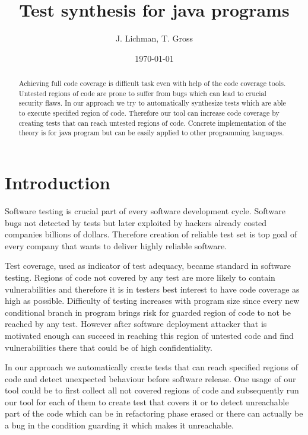 \documentclass[letterpaper,12pt]{article}
\begin{document}
\title{Test synthesis for java programs}
\author{J. Lichman, T. Gross}
\date{\today}
\maketitle

\begin{abstract}
\noindent Achieving full code coverage is difficult task even with help of the code coverage tools. Untested regions of code are prone to suffer from bugs which can lead to crucial security flaws. In our approach we try to automatically synthesize tests which are able to execute specified region of code. Therefore our tool can increase code coverage by creating tests that can reach untested regions of code. Concrete implementation of the theory is for java program but can be easily applied to other programming languages.
\end{abstract}


\section{Introduction}

Software testing is crucial part of every software development cycle. Software bugs not detected by tests but later exploited by hackers already costed companies billions of dollars. Therefore creation of reliable test set is top goal of every company that wants to deliver highly reliable software. 

Test coverage, used as indicator of test adequacy, became standard in software testing. Regions of code not covered by any test are more likely to contain vulnerabilities and therefore it is in testers best interest to have code coverage as high as possible. Difficulty of testing increases with program size since every new conditional branch in program brings risk for guarded region of code to not be reached by any test. However after software deployment attacker that is motivated enough can succeed in reaching this region of untested code and find vulnerabilities there that could be of high confidentiality. 

In our approach we automatically create tests that can reach specified regions of code and detect unexpected behaviour before software release. One usage of our tool could be to first collect all not covered regions of code and subsequently run our tool for each of them to create test that covers it or to detect unreachable part of the code which can be in refactoring phase erased or there can actually be a bug in the condition guarding it which makes it unreachable.
\end{document}
